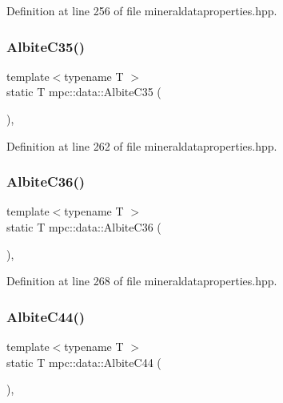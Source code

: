 Definition at line 256 of file mineraldataproperties.\+hpp.

\mbox{\label{namespacempc_1_1data_a3ba11d692b5979f1b5257aece93efe8d}} 
\subsubsection{\texorpdfstring{Albite\+C35()}{AlbiteC35()}}
{\footnotesize\ttfamily template$<$typename T $>$ \\
static T mpc\+::data\+::\+Albite\+C35 (\begin{DoxyParamCaption}{ }\end{DoxyParamCaption})\hspace{0.3cm}{\ttfamily [inline]}, {\ttfamily [static]}}



Definition at line 262 of file mineraldataproperties.\+hpp.

\mbox{\label{namespacempc_1_1data_ae133523072b6013984ebf05e7029c2c5}} 
\subsubsection{\texorpdfstring{Albite\+C36()}{AlbiteC36()}}
{\footnotesize\ttfamily template$<$typename T $>$ \\
static T mpc\+::data\+::\+Albite\+C36 (\begin{DoxyParamCaption}{ }\end{DoxyParamCaption})\hspace{0.3cm}{\ttfamily [inline]}, {\ttfamily [static]}}



Definition at line 268 of file mineraldataproperties.\+hpp.

\mbox{\label{namespacempc_1_1data_acdcfda551a878035a45212e820183b51}} 
\subsubsection{\texorpdfstring{Albite\+C44()}{AlbiteC44()}}
{\footnotesize\ttfamily template$<$typename T $>$ \\
static T mpc\+::data\+::\+Albite\+C44 (\begin{DoxyParamCaption}{ }\end{DoxyParamCaption})\hspace{0.3cm}{\ttfamily [inline]}, {\ttfamily [static]}}



